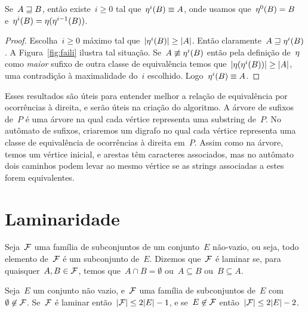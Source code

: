 \begin{lemma} \label{lem:multifail}
Se~$A \sqsupseteq B$, então existe~$i \geq 0$ tal que~$\eta^i(B) \equiv A$, onde usamos que~${\eta^0(B) = B}$ e~${\eta^i(B) = \eta(\eta^{i-1}(B))}$.
\end{lemma}

\begin{proof}
Escolha~$i \geq 0$ máximo tal que~${|\eta^i(B)| \geq |A|}$. Então claramente~${A \sqsupseteq \eta^i(B)}$. A Figura~\ref{fig:faili} ilustra tal situação. Se~${A \not\equiv \eta^i(B)}$ então pela definição de~$\eta$ como \emph{maior} sufixo de outra classe de equivalência temos que~$|\eta(\eta^i(B))| \geq |A|$, uma contradição à maximalidade do~$i$ escolhido. Logo~${\eta^i(B) \equiv A}$.
\end{proof}

Esses resultados são úteis para entender melhor a relação de equivalência por ocorrências à direita, e serão úteis na criação do algoritmo.
A árvore de sufixos de~$P$ é uma árvore na qual cada vértice representa uma substring de~$P$. No autômato de sufixos, criaremos um digrafo no qual cada vértice representa uma classe de equivalência de ocorrências à direita em~$P$. Assim como na árvore, temos um vértice inicial, e arestas têm caracteres associados, mas no autômato dois caminhos podem levar ao mesmo vértice se as strings associadas a estes forem equivalentes.

\section{Laminaridade}

Seja~$\mathcal{F}$ uma família de subconjuntos de um conjunto~$E$ não-vazio, ou seja, todo elemento de~$\mathcal{F}$ é um subconjunto de~$E$. Dizemos que~$\mathcal{F}$ é laminar se, para quaisquer~$A, B \in \mathcal{F}$, temos que~$A \cap B = \emptyset$ ou~$A \subseteq B$ ou~$B \subseteq A$.

\begin{theorem}
\label{thm:laminar}
Seja~$E$ um conjunto não vazio, e~$\mathcal{F}$ uma família de subconjuntos de~$E$ com~$\emptyset \not\in \mathcal{F}$. Se~$\mathcal{F}$ é laminar então~$|\mathcal{F}| \leq 2|E| - 1$, e se~$E \not\in \mathcal{F}$ então~$|\mathcal{F}| \leq 2|E| - 2$.
\end{theorem}

